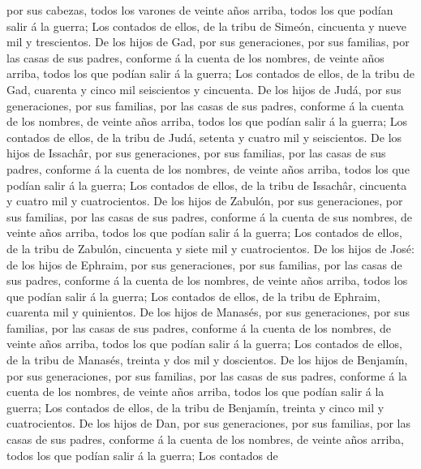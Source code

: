 por sus cabezas, todos los varones de veinte años arriba, todos los que
podían salir á la guerra;  Los contados de ellos, de la
tribu de Simeón, cincuenta y nueve mil y trescientos.  De
los hijos de Gad, por sus generaciones, por sus familias, por las casas
de sus padres, conforme á la cuenta de los nombres, de veinte años
arriba, todos los que podían salir á la guerra;  Los
contados de ellos, de la tribu de Gad, cuarenta y cinco mil seiscientos
y cincuenta.  De los hijos de Judá, por sus generaciones,
por sus familias, por las casas de sus padres, conforme á la cuenta de
los nombres, de veinte años arriba, todos los que podían salir á la
guerra;  Los contados de ellos, de la tribu de Judá,
setenta y cuatro mil y seiscientos.  De los hijos de
Issachâr, por sus generaciones, por sus familias, por las casas de sus
padres, conforme á la cuenta de los nombres, de veinte años arriba,
todos los que podían salir á la guerra;  Los contados de
ellos, de la tribu de Issachâr, cincuenta y cuatro mil y cuatrocientos.
 De los hijos de Zabulón, por sus generaciones, por sus
familias, por las casas de sus padres, conforme á la cuenta de sus
nombres, de veinte años arriba, todos los que podían salir á la guerra;
 Los contados de ellos, de la tribu de Zabulón, cincuenta
y siete mil y cuatrocientos.  De los hijos de José: de
los hijos de Ephraim, por sus generaciones, por sus familias, por las
casas de sus padres, conforme á la cuenta de los nombres, de veinte años
arriba, todos los que podían salir á la guerra;  Los
contados de ellos, de la tribu de Ephraim, cuarenta mil y quinientos.
 De los hijos de Manasés, por sus generaciones, por sus
familias, por las casas de sus padres, conforme á la cuenta de los
nombres, de veinte años arriba, todos los que podían salir á la guerra;
 Los contados de ellos, de la tribu de Manasés, treinta y
dos mil y doscientos.  De los hijos de Benjamín, por sus
generaciones, por sus familias, por las casas de sus padres, conforme á
la cuenta de los nombres, de veinte años arriba, todos los que podían
salir á la guerra;  Los contados de ellos, de la tribu de
Benjamín, treinta y cinco mil y cuatrocientos.  De los
hijos de Dan, por sus generaciones, por sus familias, por las casas de
sus padres, conforme á la cuenta de los nombres, de veinte años arriba,
todos los que podían salir á la guerra;  Los contados de
